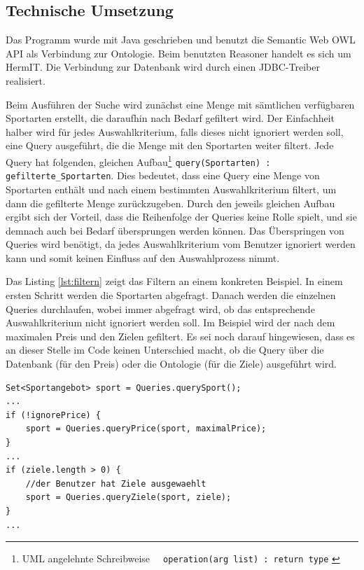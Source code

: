\subsection{Technische Umsetzung}
Das Programm wurde mit Java geschrieben und benutzt die Semantic Web OWL API \autocite{semweb:owlapi} als Verbindung zur Ontologie. Beim benutzten Reasoner handelt es sich um HermIT\autocite{krr:hermit}. Die Verbindung zur Datenbank wird durch einen JDBC-Treiber\autocite{oracle:jdbc} realisiert.

Beim Ausführen der Suche wird zunächst eine Menge mit sämtlichen verfügbaren Sportarten erstellt, die daraufhin nach Bedarf gefiltert wird. Der Einfachheit halber wird für jedes Auswahlkriterium, falls dieses nicht ignoriert werden soll, eine Query ausgeführt, die die Menge mit den Sportarten weiter filtert. Jede Query hat folgenden, gleichen Aufbau\footnote{UML angelehnte Schreibweise \lstinline"  operation(arg list) : return type" \autocite{kow:umlclass}} \lstinline"query(Sportarten) : gefilterte_Sportarten". Dies bedeutet, dass eine Query eine Menge von Sportarten enthält und nach einem bestimmten Auswahlkriterium filtert, um dann die gefilterte Menge zurückzugeben. Durch den jeweils gleichen Aufbau ergibt sich der Vorteil, dass die Reihenfolge der Queries keine Rolle spielt, und sie demnach auch bei Bedarf übersprungen werden können. Das Überspringen von Queries wird benötigt, da jedes Auswahlkriterium vom Benutzer ignoriert werden kann und somit keinen Einfluss auf den Auswahlprozess nimmt.

Das Listing \ref{lst:filtern} zeigt das Filtern an einem konkreten Beispiel. In einem ersten Schritt werden die Sportarten abgefragt. Danach werden die einzelnen Queries durchlaufen, wobei immer abgefragt wird, ob das entsprechende Auswahlkriterium nicht ignoriert werden soll. Im Beispiel wird der nach dem maximalen Preis und den Zielen gefiltert. Es sei noch darauf hingewiesen, dass es an dieser Stelle im Code keinen Unterschied macht, ob die Query über die Datenbank (für den Preis) oder die Ontologie (für die Ziele) ausgeführt wird. 

\begin{lstlisting}[float=htbp, caption=Filtern von Sportarten, label=lst:filtern]
Set<Sportangebot> sport = Queries.querySport();
...        
if (!ignorePrice) {
	sport = Queries.queryPrice(sport, maximalPrice);
}
...
if (ziele.length > 0) {
	//der Benutzer hat Ziele ausgewaehlt
	sport = Queries.queryZiele(sport, ziele);
}
...                
\end{lstlisting}

